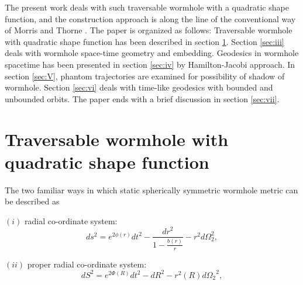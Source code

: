 \documentclass[10pt]{revtex4}
\begin{document}
The present work deals with such traversable wormhole with a quadratic shape function, and the construction approach is along the line of the conventional way of Morris and Thorne \cite{r6}.
The paper is organized as follows: Traversable wormhole with quadratic shape function has been described in section \ref{sec:ii}. Section \ref{sec:iii} deals with wormhole space-time geometry and embedding. Geodesics in wormhole spacetime has been presented in section \ref{sec:iv} by Hamilton-Jacobi approach. In section \ref{sec:V}, phantom trajectories are examined for possibility of shadow of wormhole. Section \ref{sec:vi} deals with time-like geodesics with bounded and unbounded orbits. The paper ends with a brief discussion in section \ref{sec:vii}. 
\section{ Traversable wormhole with quadratic shape function}
\label{sec:ii}
The two familiar ways in which static spherically symmetric wormhole metric can be described as \cite{r6}
\par 
$(i)$ radial co-ordinate system:
 \begin{equation}\label{eq1}
ds^2=e^{2\phi(r)}dt^2-\frac{dr^2}{1-\frac{b(r)}{r}}-r^2d\Omega_2^2,   
\end{equation}
\par
 $(ii)$ proper radial co-ordinate system:
 \begin{equation}
  dS^2=e^{2\Phi(R)}dt^2-dR^2-r^2(R)d{\Omega_2}^2,    
\end{equation}
\end{document}
